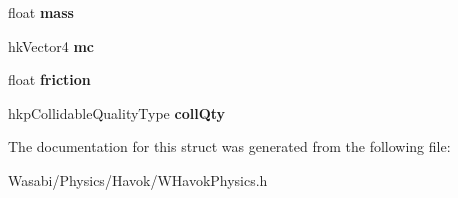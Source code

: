 \begin{DoxyCompactItemize}
\item 
float {\bfseries mass}\hypertarget{struct___w_raw_physics_props_ab08c51704afe36a09841806b7ed5543e}{}\label{struct___w_raw_physics_props_ab08c51704afe36a09841806b7ed5543e}

\item 
hk\+Vector4 {\bfseries mc}\hypertarget{struct___w_raw_physics_props_a1bb74205a7559f30c999252fc36dc70e}{}\label{struct___w_raw_physics_props_a1bb74205a7559f30c999252fc36dc70e}

\item 
float {\bfseries friction}\hypertarget{struct___w_raw_physics_props_ac50ca9ecde878446f467485de1b8aefe}{}\label{struct___w_raw_physics_props_ac50ca9ecde878446f467485de1b8aefe}

\item 
hkp\+Collidable\+Quality\+Type {\bfseries coll\+Qty}\hypertarget{struct___w_raw_physics_props_a458a2f93aba2e224068b26de67c01ba0}{}\label{struct___w_raw_physics_props_a458a2f93aba2e224068b26de67c01ba0}

\end{DoxyCompactItemize}


The documentation for this struct was generated from the following file\+:\begin{DoxyCompactItemize}
\item 
Wasabi/\+Physics/\+Havok/W\+Havok\+Physics.\+h\end{DoxyCompactItemize}
